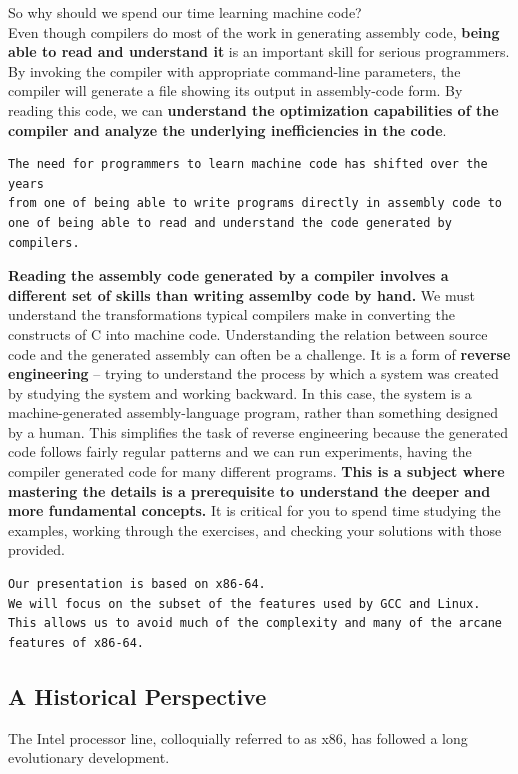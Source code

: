 \documentclass[11pt]{article}
\begin{document}
So why should we spend our time learning machine code?\\
Even though compilers do most of the work in generating assembly code, \textbf{being able to read and understand it} is an important skill for serious programmers. By invoking the compiler with appropriate command-line parameters, the compiler will generate a file showing its output in assembly-code form. By reading this code, we can \textbf{understand the optimization capabilities of the compiler and analyze the underlying inefficiencies in the code}.\\

\begin{verbatim}
The need for programmers to learn machine code has shifted over the years 
from one of being able to write programs directly in assembly code to 
one of being able to read and understand the code generated by compilers.
\end{verbatim}

\textbf{Reading the assembly code generated by a compiler involves a different set of skills than writing assemlby code by hand.} We must understand the transformations typical compilers make in converting the constructs of C into machine code. Understanding the relation between source code and the generated assembly can often be a challenge. It is a form of \textbf{reverse engineering} -- trying to understand the process by which a system was created by studying the system and working backward. In this case, the system is a machine-generated assembly-language program, rather than something designed by a human. This simplifies the task of reverse engineering because the generated code follows fairly regular patterns and we can run experiments, having the compiler generated code for many different programs. \textbf{This is a subject where mastering the details is a prerequisite to understand the deeper and more fundamental concepts.} It is critical for you to spend time studying the examples, working through the exercises, and checking your solutions with those provided.\\


\begin{verbatim}
Our presentation is based on x86-64.
We will focus on the subset of the features used by GCC and Linux.
This allows us to avoid much of the complexity and many of the arcane features of x86-64.
\end{verbatim}


\subsection{A Historical Perspective}
\label{sec:org88b8a2f}
The Intel processor line, colloquially referred to as x86, has followed a long evolutionary development.\\
\end{document}
